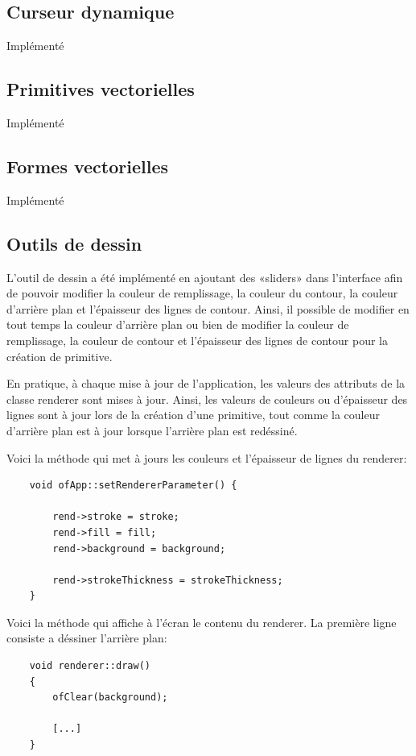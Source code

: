 \subsection{Curseur dynamique}
Implémenté

\subsection{Primitives vectorielles}
Implémenté

\subsection{Formes vectorielles}
Implémenté

\subsection{Outils de dessin}
L'outil de dessin a été implémenté en ajoutant des «sliders» dans l'interface afin de pouvoir modifier la couleur de remplissage, la couleur du contour, la couleur d'arrière plan et l'épaisseur des lignes de contour. Ainsi, il possible de modifier en tout temps la couleur d'arrière plan ou bien de modifier la couleur de remplissage, la couleur de contour et l'épaisseur des lignes de contour pour la création de primitive.

En pratique, à chaque mise à jour de l'application, les valeurs des attributs de la classe renderer sont mises à jour. Ainsi, les valeurs de couleurs ou d'épaisseur des lignes sont à jour lors de la création d'une primitive, tout comme la couleur d'arrière plan est à jour lorsque l'arrière plan est redéssiné.  

Voici la méthode qui met à jours les couleurs et l'épaisseur de lignes du renderer:
\begin{lstlisting}
	void ofApp::setRendererParameter() {
		
		rend->stroke = stroke;
		rend->fill = fill;
		rend->background = background;
		
		rend->strokeThickness = strokeThickness;
	}
\end{lstlisting}

Voici la méthode qui affiche à l'écran le contenu du renderer. La première ligne consiste a déssiner l'arrière plan:
\begin{lstlisting}
	void renderer::draw()
	{
		ofClear(background);
		
		[...]
	}
\end{lstlisting}

